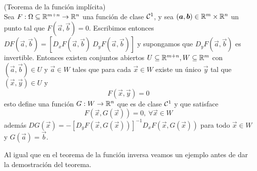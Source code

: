 \begin{teorema}{\rm (Teorema de la funci\'on impl\'icita)}\label{teofuncionimplicita}
\\Sea $F:\Omega\subseteq \mathbb{R}^{m+n}\to \mathbb{R}^n$ una funci\'on de clase
${{\cal{C}}^1}$, y sea $(\boldsymbol{a},\boldsymbol{b})\in \mathbb{R}^m\times\mathbb{R}^n$ un punto tal que
$F(\vec{a},\vec{b})=0$. Escribimos entonces $DF(\vec{a},\vec{b})=[D_x F(\vec{a},\vec{b})\: D_y F(\vec{a},\vec{b})]$
y supongamos que $D_y F(\vec{a},\vec{b})$ es invertible. Entonces existen
conjuntos abiertos $U\subseteq \mathbb{R}^{m+n}, W\subseteq\mathbb{R}^m$ con
$(\vec{a},\vec{b})\in U$ y $\vec{a}\in W$ tales que para cada $\vec{x}\in W$  existe un
\'unico $\vec{y}$ tal que $(\vec{x},\vec{y})\in U$ y
\[F(\vec{x},\vec{y})=0\]
esto define una funci\'on $G:W\to \mathbb{R}^n$ que es de clase ${{\cal{C}}^1}$ y
que satisface
\[F(\vec{x},G(\vec{x}))=0,\: \forall \vec{x}\in W\]
adem\'as $DG(\vec{x})=-[D_y F(\vec{x},G(\vec{x}))]^{-1}D_x F(\vec{x},G(\vec{x}))$ para todo $\vec{x}\in
W$ y $G(\vec{a})=\vec{b}$.
\end{teorema}
Al igual que en el teorema de la funci\'on inversa veamos un
ejemplo antes de dar la demostraci\'on del teorema.

